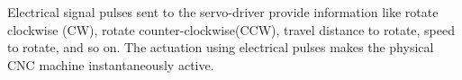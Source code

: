 
Electrical signal pulses sent to the servo-driver provide information like rotate clockwise (CW), rotate counter-clockwise(CCW), travel distance to rotate, speed to rotate, and so on. The actuation using electrical pulses makes the physical CNC machine instantaneously active. 




